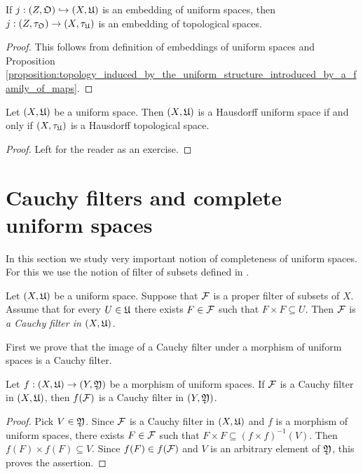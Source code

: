 \begin{corollary}\label{corollary:the_induced_topology_preserves_subspaces}
If $j:(Z,{\mathfrak O})\hookrightarrow \left(X,{\mathfrak U}\right)$ is an embedding of uniform spaces, then $j:\left(Z,\tau_{{\mathfrak O}}\right)\rightarrow \left(X,\tau_{{\mathfrak U}}\right)$ is an embedding of topological spaces.
\end{corollary}
\begin{proof}
This follows from definition of embeddings of uniform spaces and Proposition \ref{proposition:topology_induced_by_the_uniform_structure_introduced_by_a_family_of_maps}.
\end{proof}

\begin{fact}\label{fact:Hausdorff_uniform_spaces_and_Hausdorff_topological_spaces}
Let $\left(X,{\mathfrak U}\right)$ be a uniform space. Then $\left(X,{\mathfrak U}\right)$ is a Hausdorff uniform space if and only if $\left(X,\tau_{{\mathfrak U}}\right)$ is a Hausdorff topological space.
\end{fact}
\begin{proof}
Left for the reader as an exercise.
\end{proof}

\section{Cauchy filters and complete uniform spaces}
\noindent
In this section we study very important notion of completeness of uniform spaces. For this we use the notion of filter of subsets defined in \cite{Filters_in_topology}.

\begin{definition}
Let $(X,{\mathfrak U})$ be a uniform space. Suppose that ${\mathcal F}$ is a proper filter of subsets of $X$. Assume that for every $U \in {\mathfrak U}$ there exists $F \in {\mathcal F}$ such that $F\times F\subseteq U$. Then ${\mathcal F}$ is \textit{a Cauchy filter in $\left(X,{\mathfrak U}\right)$}.
\end{definition}
\noindent
First we prove that the image of a Cauchy filter under a morphism of uniform spaces is a Cauchy filter.

\begin{fact}\label{fact:images_of_Cauchy_filters_under_uniform_morphisms_are_Cauchy}
Let $f:\left(X,{\mathfrak U}\right)\rightarrow \left(Y,{\mathfrak Y}\right)$ be a morphism of uniform spaces. If ${\mathcal F}$ is a Cauchy filter in $\left(X,{\mathfrak U}\right)$, then $f({\mathcal F})$ is a Cauchy filter in $\left(Y,{\mathfrak Y}\right)$.
\end{fact}
\begin{proof}
Pick $V \in {\mathfrak Y}$. Since ${\mathcal F}$ is a Cauchy filter in $\left(X,{\mathfrak U}\right)$ and $f$ is a morphism of uniform spaces, there exists $F \in {\mathcal F}$ such that $F\times F \subseteq (f\times f)^{-1}(V)$. Then $f(F)\times f(F)\subseteq V$. Since $f(F) \in f({\mathcal F})$ and $V$ is an arbitrary element of ${\mathfrak Y}$, this proves the assertion.
\end{proof}

